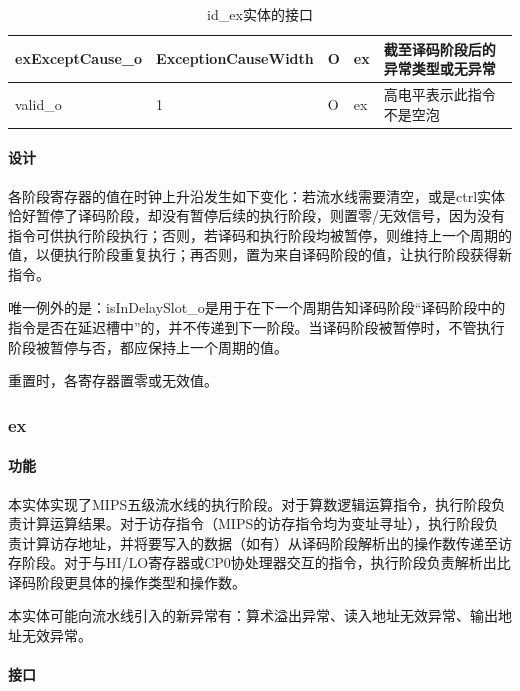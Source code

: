 \documentclass{article}
\begin{document}
\begin{spacing}{1.4}
\begin{table}[!htb]
\begin{center}
\begin{tabular*}{17cm}{l|l|l|l|p{5cm}}
\hline exExceptCause\_o        & ExceptionCauseWidth    & O     & ex            & 截至译码阶段后的异常类型或无异常 \\
\hline valid\_o                & 1                      & O     & ex            & 高电平表示此指令不是空泡 \\
\hline
\end{tabular*}
\caption{id\_ex实体的接口}
\label{tb:idex-interface}
\end{center}
\end{table}

\paragraph{设计}\mbox{}

各阶段寄存器的值在时钟上升沿发生如下变化：若流水线需要清空，或是ctrl实体恰好暂停了译码阶段，却没有暂停后续的执行阶段，则置零/无效信号，因为没有指令可供执行阶段执行；否则，若译码和执行阶段均被暂停，则维持上一个周期的值，以便执行阶段重复执行；再否则，置为来自译码阶段的值，让执行阶段获得新指令。

唯一例外的是：isInDelaySlot\_o是用于在下一个周期告知译码阶段“译码阶段中的指令是否在延迟槽中”的，并不传递到下一阶段。当译码阶段被暂停时，不管执行阶段被暂停与否，都应保持上一个周期的值。

重置时，各寄存器置零或无效值。

\subsubsection{ex}

\paragraph{功能}\mbox{}

本实体实现了MIPS五级流水线的执行阶段。对于算数逻辑运算指令，执行阶段负责计算运算结果。对于访存指令（MIPS的访存指令均为变址寻址），执行阶段负责计算访存地址，并将要写入的数据（如有）从译码阶段解析出的操作数传递至访存阶段。对于与HI/LO寄存器或CP0协处理器交互的指令，执行阶段负责解析出比译码阶段更具体的操作类型和操作数。

本实体可能向流水线引入的新异常有：算术溢出异常、读入地址无效异常、输出地址无效异常。

\paragraph{接口}\mbox{}


\end{spacing}
\end{document}
